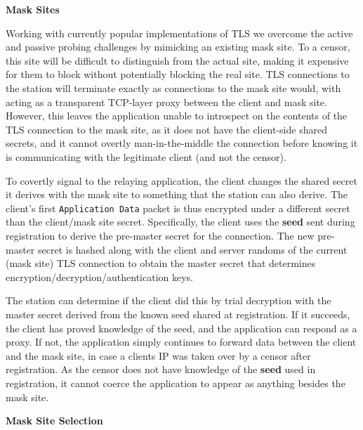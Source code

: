 \documentclass[sigconf,anonymous]{acmart}
\renewcommand{\paragraph}[1]{\smallskip\noindent\textbf{#1\quad}}
\begin{document}
\paragraph{Mask Sites}
\label{sec:mask-sites}

Working with currently popular implementations of TLS we overcome the active 
and passive probing challenges by mimicking an existing mask site. To a censor, this site
will be difficult to distinguish from the actual site, making it expensive for
them to block without potentially blocking the real site. TLS connections to the
\scheme station will terminate exactly as connections to the mask site would, with
\scheme acting as a transparent TCP-layer proxy between the client and mask site.
However, this leaves the application unable to introspect on the contents of the
TLS connection to the mask site, as it does not have the client-side shared
secrets, and it cannot overtly man-in-the-middle the connection before knowing
it is communicating with the legitimate client (and not the censor).


To covertly signal to the relaying application, the client changes the shared secret
it derives with the mask site to something that the \scheme station can also derive. The client's first
\texttt{Application Data} packet is thus encrypted under a different secret than
the client/mask site secret. Specifically, the client uses the \textbf{seed}
sent during registration to derive the pre-master secret for the connection.
The new pre-master secret is hashed along with the client and server randoms of the current
(mask site) TLS connection to obtain the master secret that determines
encryption/decryption/authentication keys.

The \scheme station can determine if the client did this by trial decryption with
the master secret derived from the known seed shared at registration. If it succeeds, the
client has proved knowledge of the seed, and the application can
respond as a proxy. If not, the application simply continues to forward data
between the client and the mask site, in case a clients IP was taken over by
a censor after registration. As the censor does not have knowledge of
the \textbf{seed} used in registration, it cannot coerce the application to
appear as anything besides the mask site.


\paragraph{Mask Site Selection}
\end{document}
